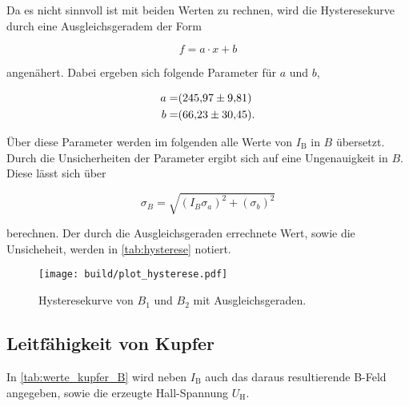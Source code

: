 Da es nicht sinnvoll ist mit beiden Werten zu rechnen, wird die Hysteresekurve durch eine Ausgleichsgeradem der Form

\begin{equation}
    f = a \cdot x + b
    \label{eq:gerade}
\end{equation}

angenähert.
Dabei ergeben sich folgende Parameter für $a$ und $b$,

\begin{align*}
    a =& \SI{245.97+-9.81}{} \\
    b =& \SI{66.23+-30.45}{}.
    \label{eq:params1}
\end{align*}

Über diese Parameter werden im folgenden alle Werte von $I_\text{B}$ in $B$ übersetzt.
Durch die Unsicherheiten der Parameter ergibt sich auf eine Ungenauigkeit in $B$.
Diese lässt sich über

\begin{equation}
    \sigma _B = \sqrt{\left(I_B \sigma _a \right)^2 + \left(\sigma _b \right)^2}
    \label{eq:B_fehler}
\end{equation}

berechnen.
Der durch die Ausgleichsgeraden errechnete Wert, sowie die Unsicheheit, werden in \autoref{tab:hysterese} notiert.

\begin{figure}
    \centering
    \texttt{[image: build/plot\_hysterese.pdf]}
    \caption{Hysteresekurve von $B_1$ und $B_2$ mit Ausgleichsgeraden.\cite{numpy}}
    \label{fig:hysterese_plot}
\end{figure}

\subsection{Leitfähigkeit von Kupfer}
\label{ssec:b}

In \autoref{tab:werte_kupfer_B} wird neben $I_\text{B}$ auch das daraus resultierende B-Feld angegeben, sowie die erzeugte Hall-Spannung $U_\text{H}$.

